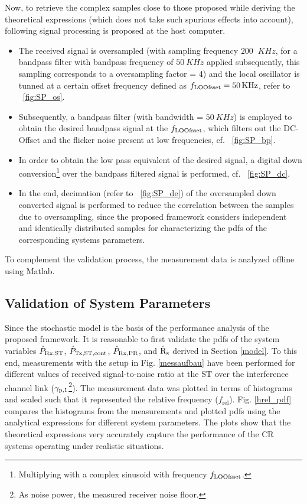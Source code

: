 Now, to retrieve the complex samples close to those proposed while deriving the theoretical expressions (which does not take such spurious effects into account), following signal processing is proposed at the host computer. 
\begin{itemize}
\item The received signal is oversampled (with sampling frequency $200$ $\SI{}{KHz}$, for a bandpass filter with bandpass frequency of $\SI{50}{KHz}$ applied subsequently, this sampling corresponds to a oversampling factor = 4) and the local oscillator is tunned at a certain offset frequency defined as $f_{\text{LOOfsset}} = \SI{50}{KHz}$, refer to \figurename~\ref{fig:SP_os}. 
\item Subsequently, a bandpass filter (with bandwidth = $\SI{50}{KHz}$) is employed to obtain the desired bandpass signal at the $f_{\text{LOOfsset}}$, which filters out the DC-Offset and the flicker noise present at low frequencies, cf. \figurename~\ref{fig:SP_bp}. 
\item In order to obtain the low pass equivalent of the desired signal, a digital down conversion\footnote{Multiplying with a complex sinusoid with frequency $f_{\text{LOOfsset}}$.} over the bandpass filtered signal is performed, cf. \figurename~\ref{fig:SP_dc}. %
\item In the end, decimation (refer to \figurename~\ref{fig:SP_de}) of the oversampled down converted signal is performed to reduce the correlation between the samples due to oversampling, since the proposed framework considers independent and identically distributed samples for characterizing the pdfs of the corresponding systems parameters. 
\end{itemize}
To complement the validation process, the measurement data is analyzed offline using Matlab.


\subsection{Validation of System Parameters}

Since the stochastic model is the basis of the performance analysis of the proposed framework. It is reasonable to first validate the pdfs of the system variables $\hat{P}_{\text{Rx,ST}}$, $\hat{P}_{\text{Tx,ST,cont}}$, $\hat{P}_{\text{Rx,PR}}$, and $\hat{\text{{R}}}_{\text{s}}$ derived in Section \ref{model}. To this end, measurements with the setup in Fig. \ref{messaufbau} have been performed for different values of received signal-to-noise ratio at the ST over the interference channel link (${\gamma}_{\text{p,1}}$\footnote{As noise power, the measured receiver noise floor.}). The measurement data was plotted in terms of histograms and scaled such that it represented the relative frequency ($f_\textrm{rel}$). Fig. \ref{hrel_pdf} compares the histograms from the measurements and plotted pdfs using the analytical expressions for different system parameters. The plots show that the theoretical expressions very accurately capture the performance of the CR systems operating under realistic situations.



